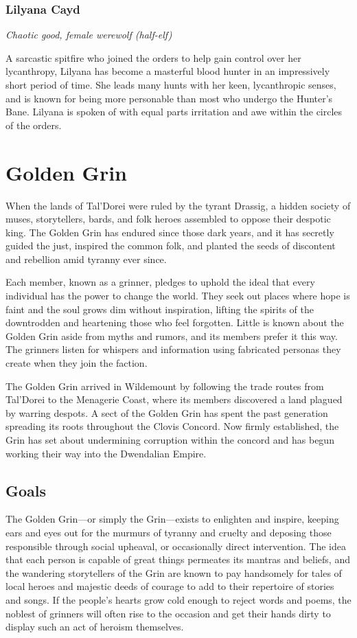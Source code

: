 \documentclass[10pt,a4paper,twoside,bg=print,twocolumn,openany,nodeprecatedcode]{dndbook}
\begin{document}
\subsubsection{Lilyana Cayd}
\textit{Chaotic good, female werewolf (half-elf)}

A sarcastic spitfire who joined the orders to help gain control over her lycanthropy, Lilyana has become a masterful blood hunter in an impressively short period of time. She leads many hunts with her keen, lycanthropic senses, and is known for being more personable than most who undergo the Hunter's Bane. Lilyana is spoken of with equal parts irritation and awe within the circles of the orders.

\section{Golden Grin}
When the lands of Tal'Dorei were ruled by the tyrant Drassig, a hidden society of muses, storytellers, bards, and folk heroes assembled to oppose their despotic king. The Golden Grin has endured since those dark years, and it has secretly guided the just, inspired the common folk, and planted the seeds of discontent and rebellion amid tyranny ever since.

Each member, known as a grinner, pledges to uphold the ideal that every individual has the power to change the world. They seek out places where hope is faint and the soul grows dim without inspiration, lifting the spirits of the downtrodden and heartening those who feel forgotten. Little is known about the Golden Grin aside from myths and rumors, and its members prefer it this way. The grinners listen for whispers and information using fabricated personas they create when they join the faction.

The Golden Grin arrived in Wildemount by following the trade routes from Tal'Dorei to the Menagerie Coast, where its members discovered a land plagued by warring despots. A sect of the Golden Grin has spent the past generation spreading its roots throughout the Clovis Concord. Now firmly established, the Grin has set about undermining corruption within the concord and has begun working their way into the Dwendalian Empire.

\subsection{Goals}
The Golden Grin—or simply the Grin—exists to enlighten and inspire, keeping ears and eyes out for the murmurs of tyranny and cruelty and deposing those responsible through social upheaval, or occasionally direct intervention. The idea that each person is capable of great things permeates its mantras and beliefs, and the wandering storytellers of the Grin are known to pay handsomely for tales of local heroes and majestic deeds of courage to add to their repertoire of stories and songs. If the people's hearts grow cold enough to reject words and poems, the noblest of grinners will often rise to the occasion and get their hands dirty to display such an act of heroism themselves.
\end{document}
